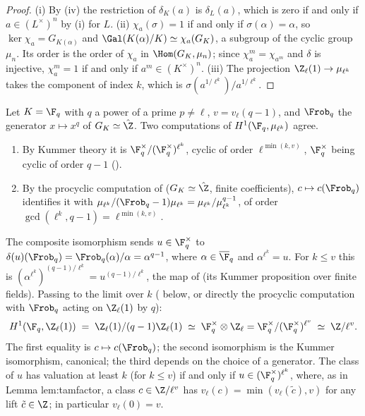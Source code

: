 \begin{proof}
(i) By (iv) the restriction of $\delta_K(a)$ is $\delta_L(a)$, which is zero if and only if $a\in(L^\times)^n$ by (i) for
$L$. (ii) $\chi_a(\sigma)=1$ if and only if $\sigma(\alpha)=\alpha$, so $\ker\chi_a=G_{K(\alpha)}$ and $\Gal(K(\alpha)/K)\simeq\chi_a(G_K)$, a subgroup of the cyclic group
$\mu_n$. Its order is the order of $\chi_a$ in $\Hom(G_K,\mu_n)$; since $\chi_a^m=\chi_{a^m}$ and $\delta$ is injective, $\chi_a^m=1$ if and only if $a^m\in(K^\times)^n$.
(iii) The projection $\Z_\ell(1)\to\mu_{\ell^k}$ takes the component of index $k$, which is $\sigma(a^{1/\ell^k})/a^{1/\ell^k}$.
\end{proof}

\begin{example}\label{ex:galcoh:kummer-finite-field}
Let $K=\F_q$ with $q$ a power of a prime $p\ne\ell$, $v=v_\ell(q-1)$, and $\Frob_q$ the generator $x\mapsto x^q$ of $G_K\simeq\hat\Z$. Two computations of
$H^1(\F_q,\mu_{\ell^k})$ agree.
\begin{enumerate}[label=(\alph*)]
\item By Kummer theory it is $\F_q^\times/(\F_q^\times)^{\ell^k}$, cyclic of order $\ell^{\min(k,v)}$, $\F_q^\times$ being cyclic of order $q-1$ ().
\item By the procyclic computation of  ($G_K\simeq\hat\Z$, finite coefficients), $c\mapsto c(\Frob_q)$ identifies it with
$\mu_{\ell^k}/(\Frob_q-1)\mu_{\ell^k}=\mu_{\ell^k}/\mu_{\ell^k}^{q-1}$, of order $\gcd(\ell^k,q-1)=\ell^{\min(k,v)}$.
\end{enumerate}
The composite isomorphism sends $u\in\F_q^\times$ to $\delta(u)(\Frob_q)=\Frob_q(\alpha)/\alpha=\alpha^{q-1}$, where $\alpha\in\overline\F_q$ and $\alpha^{\ell^k}=u$. For $k\le v$
this is $(\alpha^{\ell^k})^{(q-1)/\ell^k}=u^{(q-1)/\ell^k}$, the map of  (its Kummer proposition over finite fields). Passing to the limit over $k$
( below, or directly the procyclic computation with $\Frob_q$ acting on $\Z_\ell(1)$ by $q$):
\[
H^1(\F_q,\Z_\ell(1))\;=\;\Z_\ell(1)/(q-1)\Z_\ell(1)\;\simeq\;\F_q^\times\otimes\Z_\ell=\F_q^\times/(\F_q^\times)^{\ell^v}\;\simeq\;\Z/\ell^v .
\]
The first equality is $c\mapsto c(\Frob_q)$; the second isomorphism is the Kummer isomorphism, canonical; the third depends on the choice of a generator. The
class of $u$ has valuation at least $k$ (for $k\le v$) if and only if $u\in(\F_q^\times)^{\ell^k}$, where, as in Lemma lem:tamfactor, a class $c\in\Z/\ell^v$ has
$v_\ell(c)=\min(v_\ell(\tilde c),v)$ for any lift $\tilde c\in\Z$; in particular $v_\ell(0)=v$.


\end{example}
